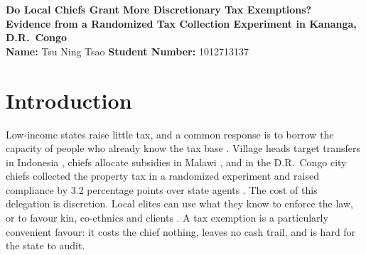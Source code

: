 \documentclass[11pt]{article}
\begin{document}
\begin{center}
{\Large\textbf{Do Local Chiefs Grant More Discretionary Tax Exemptions?\\[2pt]
Evidence from a Randomized Tax Collection Experiment in Kananga, D.R.\ Congo}}\\[8pt]
\textbf{Name:} Tsu Ning Tsao \qquad \textbf{Student Number:} 1012713137
\end{center}

\begin{abstract}
\noindent Governments in weak states increasingly hand tax collection to local elites, who know their neighbours but also have room to favour them. I use the randomized 2018 property-tax campaign in Kananga \citep{balan2022} to ask whether city chiefs, compared with state collectors, grant more exemptions that the law does not allow. Linking collectors' exemption records to the owner's age and sex, I find that chiefs record 4.8 percentage points more old-age exemptions, and that old-age exemptions given to owners below the legal age of 55 almost double (1.4\% to 2.5\%, $p=0.01$, randomization-inference $p=0.01$). Yet the total exemption rate among owners under 55 barely moves, because chiefs record fewer widow exemptions at the same time; an exemption measure that does not rely on the stated reason shows no increase. Ridge, Lasso and tree-based models find no covariate, including co-ethnicity with the chief, along which the effect of chiefs varies. Chiefs relabel exemptions more than they hand out new ones.
\end{abstract}

\section{Introduction}

Low-income states raise little tax, and a common response is to borrow the capacity of people who already know the tax base \citep{besley2009,besley2014}. Village heads target transfers in Indonesia \citep{alatas2012}, chiefs allocate subsidies in Malawi \citep{basurto2020}, and in the D.R.\ Congo city chiefs collected the property tax in a randomized experiment and raised compliance by 3.2 percentage points over state agents \citep{balan2022}. The cost of this delegation is discretion. Local elites can use what they know to enforce the law, or to favour kin, co-ethnics and clients \citep{acemoglu2014,anderson2015,baldwin2016}. A tax exemption is a particularly convenient favour: it costs the chief nothing, leaves no cash trail, and is hard for the state to audit.
\end{document}
